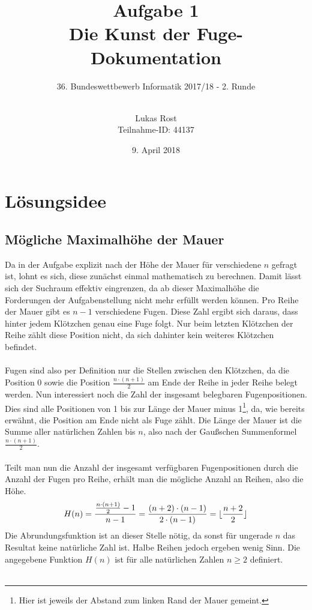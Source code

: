 \documentclass[a4paper, notitlepage, 12pt]{scrartcl}
\author{Lukas Rost \\ \small{Teilnahme-ID: 44137}}
\title{Aufgabe 1 \\ \glqq Die Kunst der Fuge\grqq  - Dokumentation}
\subtitle{36. Bundeswettbewerb Informatik 2017/18 - 2. Runde \\~\\}
\date{9. April 2018}
\DeclarePairedDelimiter\floor{\lfloor}{\rfloor}
\begin{document}
\renewcommand{\contentsname}{\centerline{Inhaltsverzeichnis}}
 \maketitle
 \tableofcontents
 \thispagestyle{empty}
 \newpage
 \setcounter{page}{1}
 
 \section{Lösungsidee}
 \subsection{Mögliche Maximalhöhe der Mauer}
 Da in der Aufgabe explizit nach der Höhe der Mauer für verschiedene $n$ gefragt ist, lohnt es sich, diese zunächst einmal mathematisch zu berechnen. Damit lässt sich der Suchraum effektiv eingrenzen, da ab dieser Maximalhöhe die Forderungen der Aufgabenstellung nicht mehr erfüllt werden können. Pro Reihe der Mauer gibt es $n-1$ verschiedene Fugen. Diese Zahl ergibt sich daraus, dass hinter jedem Klötzchen genau eine Fuge folgt. Nur beim letzten Klötzchen der Reihe zählt diese Position nicht, da sich dahinter kein weiteres Klötzchen befindet. \\ \\
Fugen sind also per Definition nur die Stellen zwischen den Klötzchen, da die Position 0 sowie die Position $\frac{n \cdot (n+1) }{2}$ am Ende der Reihe in jeder Reihe belegt werden. Nun interessiert noch die Zahl der insgesamt belegbaren Fugenpositionen. Dies sind alle Positionen von 1 bis zur Länge der Mauer minus 1\footnote{Hier ist jeweils der Abstand zum linken Rand der Mauer gemeint.}, da, wie bereits erwähnt, die Position am Ende nicht als Fuge zählt. Die Länge der Mauer ist die Summe aller natürlichen Zahlen bis $n$, also nach der Gaußschen Summenformel $\frac{n \cdot (n+1) }{2}$. \\ \\
Teilt man nun die Anzahl der insgesamt verfügbaren Fugenpositionen durch die Anzahl der Fugen pro Reihe, erhält man die mögliche Anzahl an Reihen, also die Höhe. 
\begin{equation}
H(n) = \frac{\frac{n \cdot (n+1) }{2} - 1}{n - 1} = \frac{(n + 2) \cdot (n - 1)}{2 \cdot (n - 1)} = \floor{\frac{n + 2}{2}}
\end{equation}
Die Abrundungsfunktion ist an dieser Stelle nötig, da sonst für ungerade $n$ das Resultat keine natürliche Zahl ist. Halbe Reihen jedoch ergeben wenig Sinn. Die angegebene Funktion $H(n)$ ist für alle natürlichen Zahlen $ n \geq 2$ definiert. \\ \\
\end{document}
